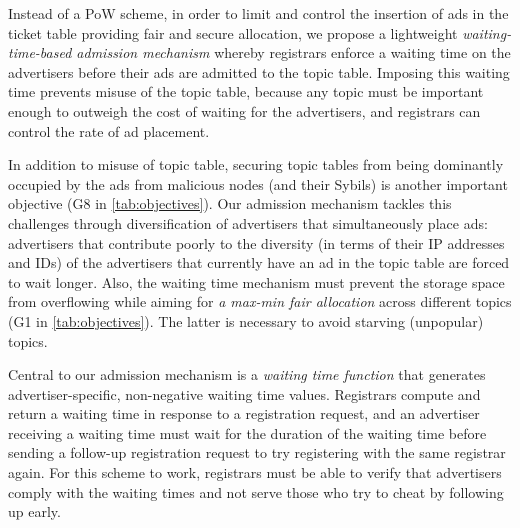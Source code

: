 Instead of a PoW scheme, in order to limit and control the insertion of ads in the ticket table providing fair and secure allocation, we propose a lightweight \textit{waiting-time-based admission mechanism} whereby registrars enforce a waiting time on the advertisers before their ads are admitted to the topic table. Imposing this waiting time prevents misuse of the topic table, because any topic must be important enough to outweigh the cost of waiting for the advertisers, and registrars can control the rate of ad placement. 

In addition to misuse of topic table, securing topic tables from being dominantly occupied by the ads from malicious nodes (and their Sybils) is another important objective (G8 in \cref{tab:objectives}). Our admission mechanism tackles this challenges through diversification of advertisers that simultaneously place ads: advertisers that contribute poorly to the diversity (in terms of their IP addresses and IDs) of the advertisers that currently have an ad in the topic table are forced to wait longer. Also, the waiting time mechanism must prevent the storage space from overflowing while aiming for \textit{a max-min fair allocation} across different topics (G1 in \cref{tab:objectives}). The latter is necessary to avoid starving (unpopular) topics. %


Central to our admission mechanism is a \textit{waiting time function} that generates advertiser-specific, non-negative waiting time values. Registrars compute and return a waiting time in response to a registration request, and an advertiser receiving a waiting time must wait for the duration of the waiting time before sending a follow-up registration request to try registering with the same registrar again. For this scheme to work, registrars must be able to verify that advertisers comply with the waiting times and not serve those who try to cheat by following up early. 

